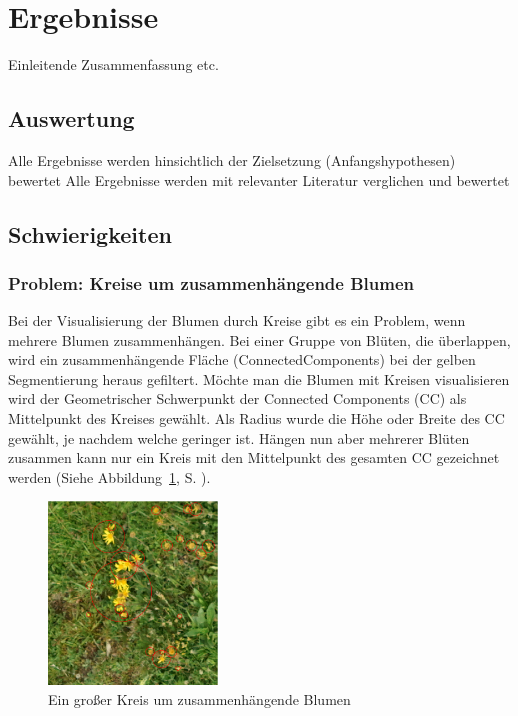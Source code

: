 \section{Ergebnisse}

Einleitende Zusammenfassung etc.
\subsection{Auswertung}
Alle Ergebnisse werden hinsichtlich der Zielsetzung (Anfangshypothesen) bewertet
Alle Ergebnisse werden mit relevanter Literatur verglichen und bewertet


\subsection{Schwierigkeiten}
\subsubsection{Problem: Kreise um zusammenhängende Blumen}

Bei der Visualisierung der Blumen durch Kreise gibt es ein Problem, wenn mehrere Blumen zusammenhängen. 
Bei einer Gruppe von Blüten, die überlappen, wird ein zusammenhängende Fläche (ConnectedComponents) bei der gelben Segmentierung heraus gefiltert. Möchte man die Blumen mit Kreisen visualisieren wird der Geometrischer Schwerpunkt der Connected Components (CC) als Mittelpunkt des Kreises gewählt. Als Radius wurde die Höhe oder Breite des CC gewählt, je nachdem welche geringer ist. Hängen nun aber mehrerer Blüten zusammen kann nur ein Kreis mit den Mittelpunkt des gesamten CC gezeichnet werden (Siehe Abbildung~\ref{fig:Kreis}, S. \pageref{fig:Kreis}).
 
\begin{figure}[htb]
 \centering
 \includegraphics[width=0.4\textwidth,angle=0]{abb/ergebnisse/probleme/bigblob}
 \caption{Ein großer Kreis um zusammenhängende Blumen}
\label{fig:Kreis}
\end{figure}

